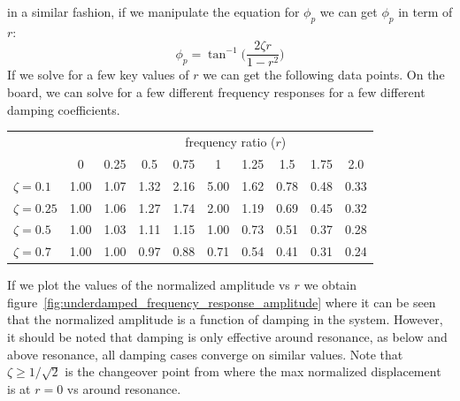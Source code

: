 \documentclass[12pt,letter]{article}
\numberwithin{ex}{section} %
\numberwithin{re}{section} %
\numberwithin{vcs}{section} %
\begin{document}
			in a similar fashion, if we manipulate the equation for $\phi_p$ we can get $\phi_p$ in term of $r$:
			\begin{equation}
				\phi_p = \tan^{-1} \bigg(\frac{2 \zeta r}{1-r^2}\bigg)
			\end{equation}	
			If we solve for a few key values of $r$ we can get the following data points. On the board, we can solve for a few different frequency responses for a few different damping coefficients. 
			\begin{table}[H]
				\centering
				\begin{tabular}{@{}lccccccccc@{}}
				\toprule
				 & & \multicolumn{8}{c}{frequency ratio ($r$)} \\ 
				 & 0 & 0.25& 0.5& 0.75& 1& 1.25& 1.5& 1.75& 2.0 \\ \midrule
				$\zeta=0.1$	&	1.00&	1.07&	1.32&	2.16&	5.00&	1.62&	0.78&	0.48 & 0.33 \\ 
				$\zeta=0.25$	&	1.00&	1.06&	1.27&	1.74&	2.00&	1.19&	0.69&	0.45 & 0.32 \\ 
				$\zeta=0.5$	&	1.00&	1.03&	1.11&	1.15&	1.00&	0.73&	0.51&	0.37 & 0.28\\ 
				$\zeta=0.7$	&	1.00&  1.00	&   0.97&	0.88&	0.71&	0.54&	0.41&	0.31 & 0.24\\\bottomrule
				\end{tabular}
			\end{table}
			If we plot the values of the normalized amplitude vs $r$ we obtain figure~\ref{fig:underdamped_frequency_response_amplitude} where it can be seen that the normalized amplitude is a function of damping in the system. However, it should be noted that damping is only effective around resonance, as below and above resonance, all damping cases converge on similar values. Note that $\zeta \ge 1/\sqrt{2}$ is the changeover point from where the max normalized displacement is at $r=0$ vs around resonance.  
		   
\end{document}
